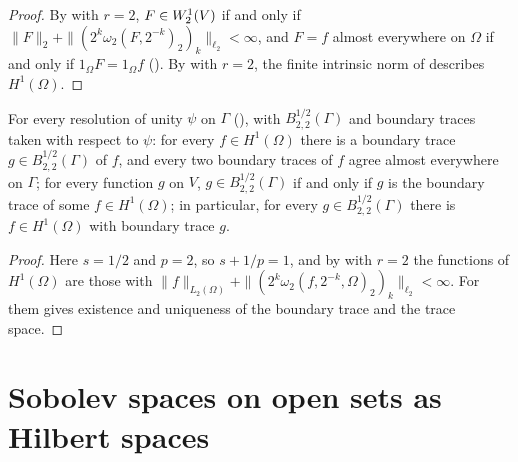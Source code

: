 \begin{proof}
\leanok
By  with $r = 2$, $F \in W^{1}_{2}(V)$ if and only if
$\|F\|_2 + \|(2^k \omega_2(F, 2^{-k})_2)_k\|_{\ell_2} < \infty$, and $F = f$ almost everywhere on
$\Omega$ if and only if $1_\Omega F = 1_\Omega f$ (). By
 with $r = 2$, the finite intrinsic norm of
 describes $H^1(\Omega)$.
\end{proof}

\begin{theorem}
\label{thm:sobolev-lipschitz-domain-trace}
\leanok
{}
For every resolution of unity $\psi$ on $\Gamma$ (), with
$B^{1/2}_{2,2}(\Gamma)$ and boundary traces taken with respect to $\psi$: for every
$f \in H^1(\Omega)$ there is a boundary trace $g \in B^{1/2}_{2,2}(\Gamma)$ of $f$, and every two
boundary traces of $f$ agree almost everywhere on $\Gamma$; for every function $g$ on $V$,
$g \in B^{1/2}_{2,2}(\Gamma)$ if and only if $g$ is the boundary trace of some
$f \in H^1(\Omega)$; in particular, for every $g \in B^{1/2}_{2,2}(\Gamma)$ there is
$f \in H^1(\Omega)$ with boundary trace $g$.
\end{theorem}

\begin{proof}
\leanok
Here $s = 1/2$ and $p = 2$, so $s + 1/p = 1$, and by
 with $r = 2$ the functions of $H^1(\Omega)$ are those
with
$\|f\|_{L_2(\Omega)} + \|(2^k \omega_2(f, 2^{-k}, \Omega)_2)_k\|_{\ell_2} < \infty$. For them
 gives existence and uniqueness of the boundary trace and the trace
space.
\end{proof}

\section{Sobolev spaces on open sets as Hilbert spaces}
\label{sec:sobolev-restriction-spaces}

